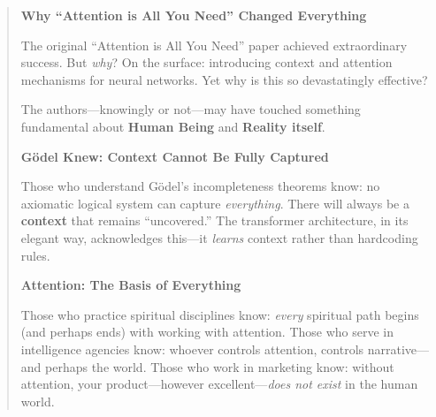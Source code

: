 \documentclass[11pt,a4paper]{article}
\theoremstyle{definition}
\theoremstyle{remark}
\begin{document}
\begin{abstract}



\noindent\textbf{Why ``Attention is All You Need'' Changed Everything}

The original ``Attention is All You Need'' paper achieved extraordinary success. But \textit{why}? On the surface: introducing context and attention mechanisms for neural networks. Yet why is this so devastatingly effective?

The authors---knowingly or not---may have touched something fundamental about \textbf{Human Being} and \textbf{Reality itself}.

\medskip
\noindent\textbf{Gödel Knew: Context Cannot Be Fully Captured}

Those who understand Gödel's incompleteness theorems know: no axiomatic logical system can capture \textit{everything}. There will always be a \textbf{context} that remains ``uncovered.'' The transformer architecture, in its elegant way, acknowledges this---it \textit{learns} context rather than hardcoding rules.

\medskip
\noindent\textbf{Attention: The Basis of Everything}

Those who practice spiritual disciplines know: \textit{every} spiritual path begins (and perhaps ends) with working with attention. Those who serve in intelligence agencies know: whoever controls attention, controls narrative---and perhaps the world. Those who work in marketing know: without attention, your product---however excellent---\textit{does not exist} in the human world. 


\end{abstract}
\end{document}

